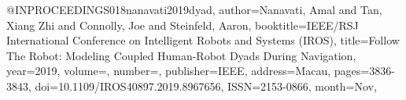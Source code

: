 @INPROCEEDINGS{018nanavati2019dyad,
author={Nanavati, Amal and Tan, Xiang Zhi and Connolly, Joe and Steinfeld, Aaron},
booktitle={IEEE/RSJ International Conference on Intelligent Robots and Systems (IROS)}, 
title={Follow The Robot: Modeling Coupled Human-Robot Dyads During Navigation}, 
year={2019},
volume={},
number={},
publisher={IEEE},
address={Macau},
pages={3836-3843},
doi={10.1109/IROS40897.2019.8967656},
ISSN={2153-0866},
month={Nov},}